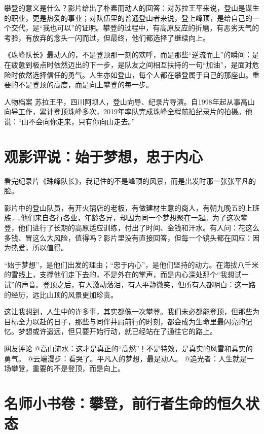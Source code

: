 攀登的意义是什么？影片给出了朴素而动人的回答：对苏拉王平来说，登山是谋生的职业，更是热爱的事业；对队伍里的普通登山者来说，登上峰顶，是给自己的一个交代，是“我也可以”的证明。攀登的过程中，有高原反应的折磨，有恶劣天气的考验，有放弃的念头一闪而过，但最终，他们都选择了继续向上。

《珠峰队长》最动人的，不是登顶那一刻的欢呼，而是那些“逆流而上”的瞬间：是在疲惫到极点时依然迈出的下一步，是队友之间相互扶持的一句“加油”，是面对危险时依然选择信任的勇气。人生亦如登山，每个人都在攀登属于自己的那座山。重要的不是登顶的高度，而是向上攀登的每一步。

\begin{quoteBox}{人物档案}
苏拉王平，四川阿坝人，登山向导、纪录片导演。自1998年起从事高山向导工作，累计登顶珠峰多次，2019年率队完成珠峰全程航拍纪录片的拍摄。他说：“山不会向你走来，只有你向山走去。”
\end{quoteBox}

\clearpage
\section*{观影评说：始于梦想，忠于内心}

看完纪录片《珠峰队长》，我记住的不是峰顶的风景，而是出发时那一张张平凡的脸。

影片中的登山队员，有开火锅店的老板，有做建材生意的商人，有朝九晚五的上班族……他们来自各行各业，年龄各异，却因为同一个梦想聚在一起。为了这次攀登，他们进行了长期的高原适应训练，付出了时间、金钱和汗水。有人问：花这么多钱、冒这么大风险，值得吗？影片里没有直接回答，但每一个镜头都在回应：因为热爱，所以值得。

“始于梦想”，是他们出发的理由；“忠于内心”，是他们坚持的动力。在海拔八千米的雪线上，支撑他们走下去的，不是外在的掌声，而是内心深处那个“我想试一试”的声音。登顶之后，有人激动落泪，有人平静微笑，但所有人都明白：这一路的经历，远比山顶的风景更加珍贵。

这让我想到，人生中的许多事，其实都像一次攀登。我们未必都能登顶，但那些为目标全力以赴的日子，那些与同伴并肩前行的时刻，都会成为生命里最闪亮的记忆。梦想或许遥远，但只要开始行动，就已经站在了通往它的路上。

\begin{quoteBox}{网友评论}
@高山流水：这才是真正的“高燃”！不是特效，是真实的风雪和真实的勇气。
@云端漫步：看哭了。平凡人的梦想，最是动人。
@追光者：人生就是一场攀登，重要的不是登顶，而是向上。
\end{quoteBox}

\clearpage
\section*{名师小书卷：攀登，前行者生命的恒久状态}


